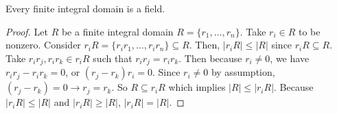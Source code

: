 \documentclass [12pt] {article}
\newenvironment{theorem}[1]{\begin{tcolorbox}[title={Theorem #1},colback=green!5!white,colframe=black!75!green]}{\end{tcolorbox}}
\begin{document}
\begin{theorem}{}
    Every finite integral domain is a field.
\end{theorem}
\begin{proof}
    Let $R$ be a finite integral domain $R = \{  r_1, \ldots, r_n \}$. Take $r_i \in R$ to be 
    nonzero. Consider $r_i R = \{ r_i r_1, \ldots, r_i r_n \} \subseteq R$. Then, $|r_i R| \leq |R|$
    since $r_i R \subseteq R$. Take $r_i r_j, r_i r_k \in r_i R$ such that  $r_i r_j = r_i r_k$.
    Then because $r_i \neq 0$, we have $r_i r_j - r_i r_k = 0$, or $(r_j - r_k) r_i = 0$. Since
    $r_i \neq 0$ by assumption, $(r_j - r_k) = 0 \to r_j = r_k$. So $R \subseteq r_i R$ which
    implies $|R| \leq |r_i R|$. Because $|r_i R| \leq |R|$ and $|r_i R| \geq |R|$, $|r_i R| = |R|$.
\end{proof}
\end{document}
